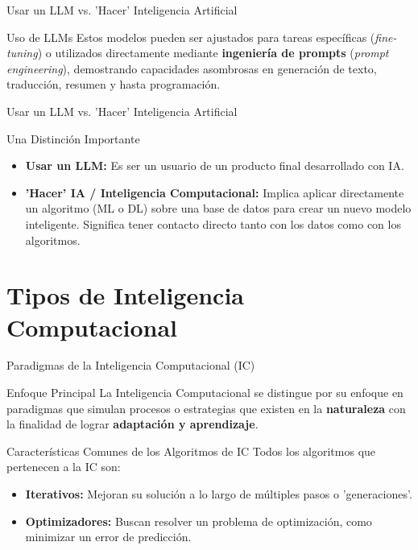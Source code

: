\documentclass[aspectratio=169,xcolor=dvipsnames]{beamer}
\begin{document}

\begin{frame}{Usar un LLM vs. 'Hacer' Inteligencia Artificial}
    \begin{block}{Uso de LLMs}
    Estos modelos pueden ser ajustados para tareas específicas (\textit{fine-tuning}) o utilizados directamente mediante \textbf{ingeniería de prompts} (\textit{prompt engineering}), demostrando capacidades asombrosas en generación de texto, traducción, resumen y hasta programación.
    \end{block}
\end{frame}
\begin{frame}{Usar un LLM vs. 'Hacer' Inteligencia Artificial}
    \begin{alertblock}{Una Distinción Importante}
        \begin{itemize}
            \item \textbf{Usar un LLM:} Es ser un usuario de un producto final desarrollado con IA.
            \item \textbf{'Hacer' IA / Inteligencia Computacional:} Implica aplicar directamente un algoritmo (ML o DL) sobre una base de datos para crear un nuevo modelo inteligente. Significa tener contacto directo tanto con los datos como con los algoritmos.
        \end{itemize}
    \end{alertblock}
\end{frame}

\section{Tipos de Inteligencia Computacional}

\begin{frame}{Paradigmas de la Inteligencia Computacional (IC)}
    \begin{block}{Enfoque Principal}
    La Inteligencia Computacional se distingue por su enfoque en paradigmas que simulan procesos o estrategias que existen en la \textbf{naturaleza} con la finalidad de lograr \textbf{adaptación y aprendizaje}.
    \end{block}
    
    \begin{alertblock}{Características Comunes de los Algoritmos de IC}
    Todos los algoritmos que pertenecen a la IC son:
        \begin{itemize}
            \item \textbf{Iterativos:} Mejoran su solución a lo largo de múltiples pasos o 'generaciones'.
            \item \textbf{Optimizadores:} Buscan resolver un problema de optimización, como minimizar un error de predicción.
        \end{itemize}
    \end{alertblock}
\end{frame}
\end{document}

